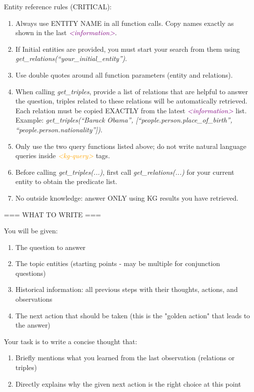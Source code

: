 \begin{tcolorbox}
Entity reference rules (CRITICAL):
\begin{enumerate}
  \item Always use ENTITY NAME in all function calls. Copy names exactly as shown in the last \textcolor{purple}{\textit{<information>}}.
  \item If Initial entities are provided, you must start your search from them using \textit{get\_relations(``your\_initial\_entity'')}.
  \item Use double quotes around all function parameters (entity and relations).
  \item When calling \textit{get\_triples}, provide a list of relations that are helpful to answer the question, triples related to these relations will be automatically retrieved. Each relation must be copied EXACTLY from the latest \textcolor{purple}{\textit{<information>}} list. Example: \textit{get\_triples(``Barack Obama'', [``people.person.place\_of\_birth'', ``people.person.nationality''])}.
  \item Only use the two query functions listed above; do not write natural language queries inside \textcolor{orange}{\textit{<kg-query>}} tags.
  \item Before calling \textit{get\_triples(...)}, first call \textit{get\_relations(...)} for your current entity to obtain the predicate list.
  \item No outside knowledge: answer ONLY using KG results you have retrieved.
\end{enumerate}

=== WHAT TO WRITE ===

You will be given:
\begin{enumerate}
  \item The question to answer
  \item The topic entities (starting points - may be multiple for conjunction questions)
  \item Historical information: all previous steps with their thoughts, actions, and observations
  \item The next action that should be taken (this is the "golden action" that leads to the answer)
\end{enumerate}

Your task is to write a concise thought that:
\begin{enumerate}
  \item Briefly mentions what you learned from the last observation (relations or triples)
  \item Directly explains why the given next action is the right choice at this point
\end{enumerate}


\end{tcolorbox}
